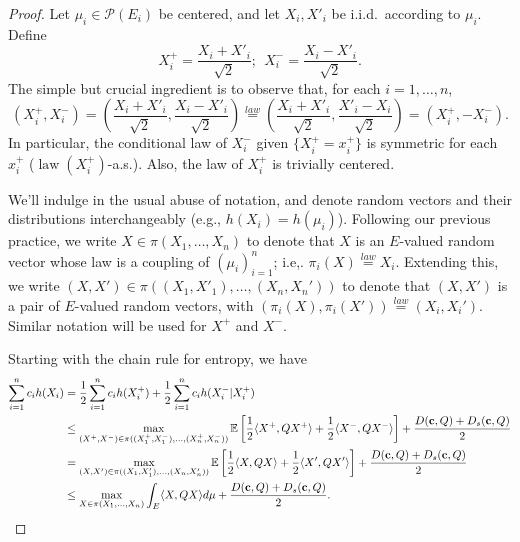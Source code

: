 \documentclass[10pt]{article}
\newcommand{\EE}{\mathbb{E}}
\begin{document}
 \begin{proof}
 Let $\mu_i \in \mathcal{P}(E_i)$ be centered, and let  $X_i, X'_i$ be i.i.d.~according to $\mu_i$. 
Define
$$
X^+_i = \frac{X_i + X'_i}{\sqrt{2}}; ~~X^-_i = \frac{X_i - X'_i}{\sqrt{2}}. \label{eq:Xminus}
$$
The simple but crucial ingredient is to observe that, for each $i=1,\dots, n$, 
$$
(X_i^+,X_i^-) = \left( \frac{X_i + X'_i}{\sqrt{2}},  \frac{X_i - X'_i}{\sqrt{2}} \right)  \overset{law}{=} \left( \frac{X_i + X'_i}{\sqrt{2}},  \frac{X'_i - X_i}{\sqrt{2}} \right) = (X_i^+,- X_i^-).
$$
In particular, the conditional law of $X_i^-$ given $\{X^+_i = x^+_i\}$ is symmetric  for each $x_i^+$ ($\operatorname{law}(X_i^+)$-a.s.).  Also, the law of $X^+_i$ is trivially centered.

We'll indulge in the usual abuse of notation, and denote random vectors and their distributions interchangeably (e.g., $h(X_i) = h(\mu_i)$).  Following our previous practice, we write $X\in \pi(X_1, \dots, X_n)$ to denote that $X$ is an $E$-valued random vector whose law is a coupling of $(\mu_i)_{i=1}^n$; i.e,. $\pi_i(X) \overset{law}{=}  X_i$.  Extending this, we  write $(X,X')\in \pi((X_1,X'_1), \dots, (X_n,X_n'))$ to denote that $(X,X')$ is a pair of $E$-valued random vectors, with $(\pi_i(X),\pi_i(X')) \overset{law}{=} (X_i,X_i')$.  Similar notation will be used for $X^+$ and $X^-$.  

Starting with the chain rule for entropy, we have 
\begin{align}
 \sum_{i=1}^n c_i h(X_i) &= \frac{1}{2}\sum_{i=1}^n c_i h(X^+_i) + \frac{1}{2}\sum_{i=1}^n c_i   h(X^-_i|X^+_i)  \notag \\
 &\leq \max_{(X^+,X^-)\in \pi((X^+_1,X^-_1), \dots, (X^+_n,X^-_n)) } \EE\left[  \frac{1}{2}\langle X^+, Q X^+\rangle +  \frac{1}{2}\langle X^-, Q X^- \rangle \right]
 + \frac{D(\mathbf{c},Q) + D_s(\mathbf{c},Q) }{2}\label{eq:doubling}\\
 &= \max_{(X,X')\in \pi((X_1,X'_1), \dots, (X_n,X_n')) } \EE\left[  \frac{1}{2}\langle X, Q X\rangle +  \frac{1}{2}\langle X', Q X' \rangle \right]
 + \frac{D(\mathbf{c},Q) + D_s(\mathbf{c},Q) }{2} \label{eq:rotateBack}\\
   &\leq  \max_{X \in \pi( X_1, \dots, X_n ) }  \int_E \langle X, Q X\rangle d\mu  + \frac{D(\mathbf{c},Q) + D_s(\mathbf{c},Q) }{2}. \label{eqLinExp}
\end{align}



\end{proof}
\end{document}
